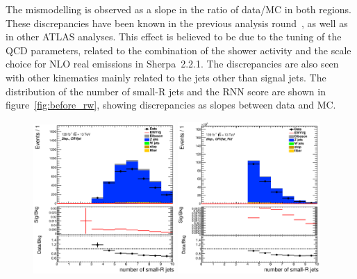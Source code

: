 The mismodelling is observed as a slope in the ratio of data/MC in both regions.
These discrepancies have been known in the previous analysis round~\cite{STDM-2017-20}, as well as in other ATLAS analyses. 
This effect is believed to be due to the tuning of the QCD parameters, related to the combination of the shower activity and the scale choice for NLO real emissions in Sherpa~2.2.1.
The discrepancies are also seen with other kinematics mainly related to the jets other than signal jets. The distribution of the number of small-R jets and 
the RNN score are shown in figure~\ref{fig:before_rw}, showing discrepancies as slopes between data and MC.
\begin{figure}[ht]
    \centering
    \includegraphics[width=0.48\textwidth]{figures/2lep/reweighting/before_reweighting/C_0ptag1pfat0pjet_0ptv_CRVjet_NJets_Lin.eps}
    \includegraphics[width=0.48\textwidth]{figures/2lep/reweighting/before_reweighting/C_0ptag2pjet_0ptv_CRVjet_Fid_NJets_Lin.eps}

\end{figure}
